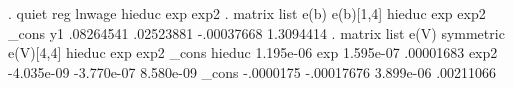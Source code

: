 . quiet reg lnwage hieduc exp exp2
{\smallskip}
. matrix list e(b)
{\smallskip}
e(b)[1,4]
        hieduc         exp        exp2       _cons
y1   .08264541   .02523881  -.00037668   1.3094414
{\smallskip}
. matrix list e(V)
{\smallskip}
symmetric e(V)[4,4]
            hieduc         exp        exp2       _cons
hieduc   1.195e-06
   exp   1.595e-07   .00001683
  exp2  -4.035e-09  -3.770e-07   8.580e-09
 _cons   -.0000175  -.00017676   3.899e-06   .00211066
{\smallskip}
